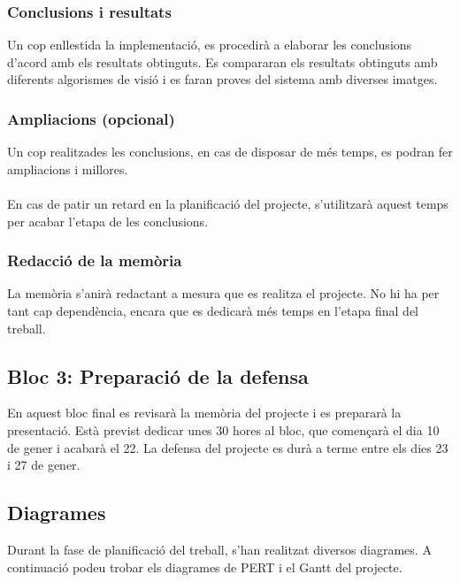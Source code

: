		\subsubsection{Conclusions i resultats}
			Un cop enllestida la implementació, es procedirà a elaborar les conclusions d'acord amb els resultats obtinguts. Es compararan els resultats obtinguts amb diferents algorismes de visió i es faran
			proves del sistema amb diverses imatges.
		\subsubsection{Ampliacions (opcional)}
			Un cop realitzades les conclusions, en cas de disposar de més temps, es podran fer ampliacions i millores.\\\\
			En cas de patir un retard en la planificació del projecte, s'utilitzarà aquest temps per acabar l'etapa de les conclusions.
		\subsubsection{Redacció de la memòria}
			La memòria s'anirà redactant a mesura que es realitza el projecte. No hi ha per tant cap dependència, encara que es dedicarà més temps en l'etapa final del treball.\\

	\subsection{Bloc 3: Preparació de la defensa}
	En aquest bloc final es revisarà la memòria del projecte i es prepararà la presentació. Està previst dedicar unes 30 hores al bloc, que començarà el dia 10 de gener i acabarà el 22.
	La defensa del projecte es durà a terme entre els dies 23 i 27 de gener.

	\subsection{Diagrames}
		Durant la fase de planificació del treball, s'han realitzat diversos diagrames. A continuació podeu trobar els diagrames de PERT i el Gantt del projecte.\\

